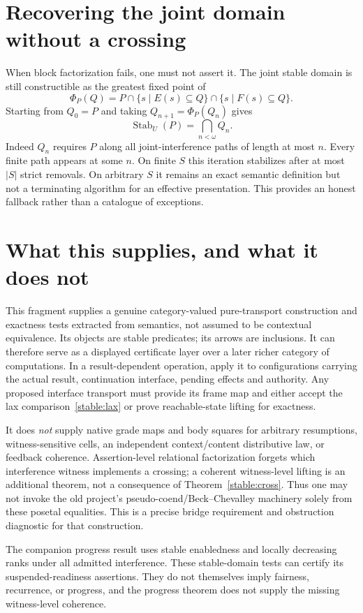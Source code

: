 \documentclass[11pt]{article}
\newcommand{\Stab}{\operatorname{Stab}}
\begin{document}
\section{Recovering the joint domain without a crossing}
When block factorization fails, one must not assert it. The joint stable domain is still constructible as the greatest fixed point of
\[
 \Phi_P(Q)=P\cap\{s\mid E(s)\subseteq Q\}\cap\{s\mid F(s)\subseteq Q\}.
\]
Starting from $Q_0=P$ and taking $Q_{n+1}=\Phi_P(Q_n)$ gives
\[
 \Stab_U(P)=\bigcap_{n<\omega}Q_n.
\]
Indeed $Q_n$ requires $P$ along all joint-interference paths of length at most $n$. Every finite path appears at some $n$. On finite $S$ this iteration stabilizes after at most $|S|$ strict removals. On arbitrary $S$ it remains an exact semantic definition but not a terminating algorithm for an effective presentation. This provides an honest fallback rather than a catalogue of exceptions.

\section{What this supplies, and what it does not}
This fragment supplies a genuine category-valued pure-transport construction and exactness tests extracted from semantics, not assumed to be contextual equivalence. Its objects are stable predicates; its arrows are inclusions. It can therefore serve as a displayed certificate layer over a later richer category of computations. In a result-dependent operation, apply it to configurations carrying the actual result, continuation interface, pending effects and authority. Any proposed interface transport must provide its frame map and either accept the lax comparison~\eqref{stable:lax} or prove reachable-state lifting for exactness.

It does \emph{not} supply native grade maps and body squares for arbitrary resumptions, witness-sensitive cells, an independent context/content distributive law, or feedback coherence. Assertion-level relational factorization forgets which interference witness implements a crossing; a coherent witness-level lifting is an additional theorem, not a consequence of Theorem~\ref{stable:cross}. Thus one may not invoke the old project's pseudo-coend/Beck--Chevalley machinery solely from these posetal equalities. This is a precise bridge requirement and obstruction diagnostic for that construction.

The companion progress result uses stable enabledness and locally decreasing ranks under all admitted interference. These stable-domain tests can certify its suspended-readiness assertions. They do not themselves imply fairness, recurrence, or progress, and the progress theorem does not supply the missing witness-level coherence.
\end{document}
